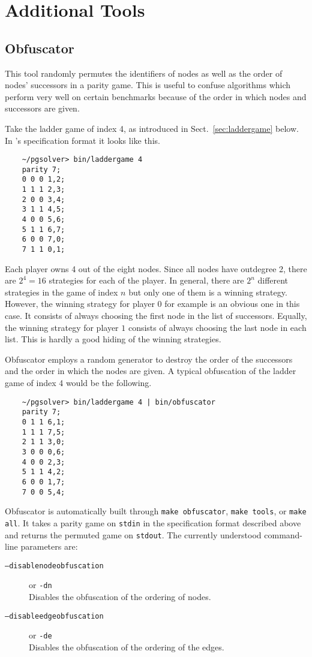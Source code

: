 \section{Additional Tools}
\label{sec:tools}

\subsection{Obfuscator}

This tool randomly permutes the identifiers of nodes as well as the order
of nodes' successors in a parity game. This is useful to confuse algorithms
which perform very well on certain benchmarks because of the order in which
nodes and successors are given.

\begin{example}
Take the ladder game of index 4, as introduced in Sect.~\ref{sec:laddergame}
below. In \pgsolver's specification format it looks like this.
\begin{verbatim}
    ~/pgsolver> bin/laddergame 4
    parity 7;
    0 0 0 1,2;
    1 1 1 2,3;
    2 0 0 3,4;
    3 1 1 4,5;
    4 0 0 5,6;
    5 1 1 6,7;
    6 0 0 7,0;
    7 1 1 0,1;
\end{verbatim}
Each player owns 4 out of the eight nodes. Since all nodes have outdegree 2, there
are $2^4 = 16$ strategies for each of the player. In general, there are $2^n$
different strategies in the game of index $n$ but only one of them is
a winning strategy. However, the winning strategy for player $0$ for example is
an obvious one in this case. It consists of always choosing the first node in the
list of successors. Equally, the winning strategy for player $1$ consists of always
choosing the last node in each list. This is hardly a good hiding of the winning
strategies.

Obfuscator employs a random generator to destroy the order of the successors and
the order in which the nodes are given. A typical obfuscation of the ladder game of
index 4 would be the following.
\begin{verbatim}
    ~/pgsolver> bin/laddergame 4 | bin/obfuscator
    parity 7;
    0 1 1 6,1;
    1 1 1 7,5;
    2 1 1 3,0;
    3 0 0 0,6;
    4 0 0 2,3;
    5 1 1 4,2;
    6 0 0 1,7;
    7 0 0 5,4;
\end{verbatim}
\end{example}

Obfuscator is automatically built through \verb#make obfuscator#,
\verb#make tools#, or \verb#make all#.
It takes a parity game on \texttt{stdin} in the specification format described above
and returns the permuted game on \texttt{stdout}. The currently understood command-line
parameters are:
\begin{description}
\item[{\tt --disablenodeobfuscation}] \enspace or {\tt -dn} \\
	Disables the obfuscation of the ordering of nodes.

\item[{\tt --disableedgeobfuscation}] \enspace or {\tt -de} \\
    Disables the obfuscation of the ordering of the edges.
\end{description}



